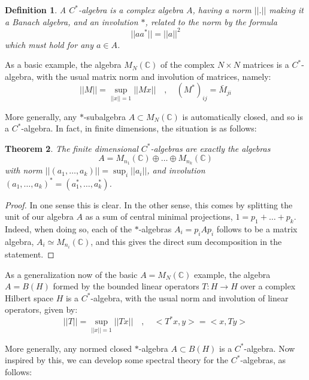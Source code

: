 \documentclass[12pt]{amsbook}
\newtheorem{theorem}{Theorem}[chapter]
\newtheorem{definition}[theorem]{Definition}
\begin{document}
\begin{definition}
A $C^*$-algebra is a complex algebra $A$, having a norm $||.||$ making it a Banach algebra, and an involution $*$, related to the norm by the formula 
$$||aa^*||=||a||^2$$
which must hold for any $a\in A$.
\end{definition}

As a basic example, the algebra $M_N(\mathbb C)$ of the complex $N\times N$ matrices is a $C^*$-algebra, with the usual matrix norm and involution of matrices, namely:
$$||M||=\sup_{||x||=1}||Mx||\quad,\quad 
(M^*)_{ij}=\bar{M}_{ji}$$

More generally, any $*$-subalgebra $A\subset M_N(\mathbb C)$ is automatically closed, and so is a $C^*$-algebra. In fact, in finite dimensions, the situation is as follows:

\begin{theorem}
The finite dimensional $C^*$-algebras are exactly the algebras
$$A=M_{n_1}(\mathbb C)\oplus\ldots\oplus M_{n_k}(\mathbb C)$$
with norm $||(a_1,\ldots,a_k)||=\sup_i||a_i||$, and involution $(a_1,\ldots,a_k)^*=(a_1^*,\ldots,a_k^*)$.
\end{theorem}

\begin{proof}
In one sense this is clear. In the other sense, this comes by splitting the unit of our algebra $A$ as a sum of central minimal projections, $1=p_1+\ldots+p_k$. Indeed, when doing so, each of the $*$-algebras $A_i=p_iAp_i$ follows to be a matrix algebra, $A_i\simeq M_{n_i}(\mathbb C)$, and this gives the direct sum decomposition in the statement.
\end{proof}

As a generalization now of the basic $A=M_N(\mathbb C)$ example, the algebra $A=B(H)$ formed by the bounded linear operators $T:H\to H$ over a complex Hilbert space $H$ is a $C^*$-algebra, with the usual norm and involution of linear operators, given by:
$$||T||=\sup_{||x||=1}||Tx||\quad,\quad 
<T^*x,y>=<x,Ty>$$

More generally, any normed closed $*$-algebra $A\subset B(H)$ is a $C^*$-algebra. Now inspired by this, we can develop some spectral theory for the $C^*$-algebras, as follows:
\end{document}
